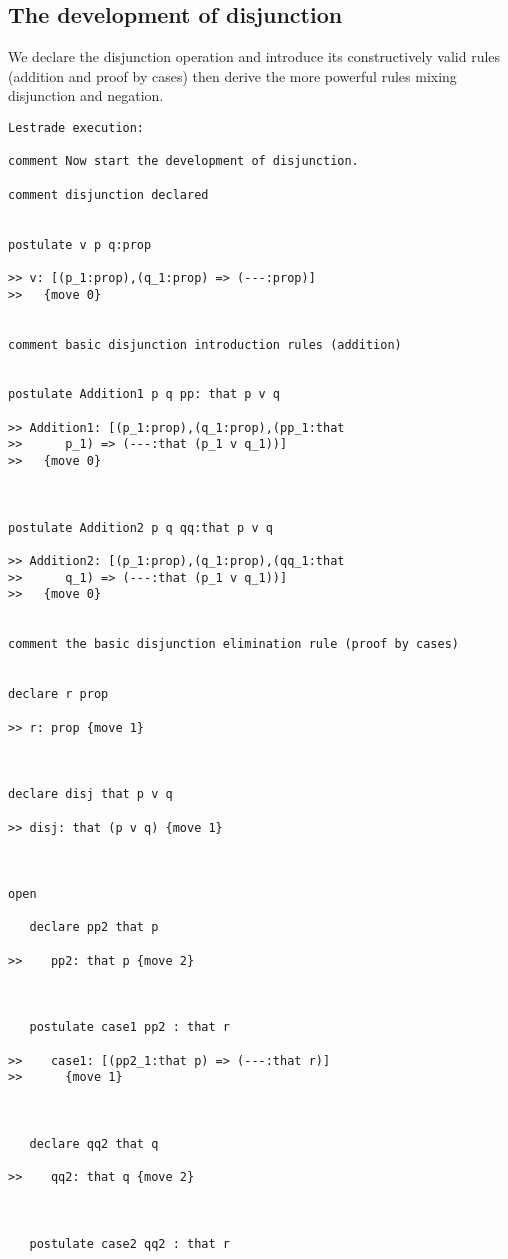 \documentclass[12pt]{article}
\begin{document}
\subsection{The development of disjunction}

We declare the disjunction operation and introduce its constructively valid rules (addition and proof by cases)  then derive the more powerful rules mixing disjunction and negation.

\begin{verbatim}Lestrade execution:

comment Now start the development of disjunction.

comment disjunction declared


postulate v p q:prop

>> v: [(p_1:prop),(q_1:prop) => (---:prop)]
>>   {move 0}


comment basic disjunction introduction rules (addition)


postulate Addition1 p q pp: that p v q

>> Addition1: [(p_1:prop),(q_1:prop),(pp_1:that
>>      p_1) => (---:that (p_1 v q_1))]
>>   {move 0}



postulate Addition2 p q qq:that p v q

>> Addition2: [(p_1:prop),(q_1:prop),(qq_1:that
>>      q_1) => (---:that (p_1 v q_1))]
>>   {move 0}


comment the basic disjunction elimination rule (proof by cases)


declare r prop

>> r: prop {move 1}



declare disj that p v q

>> disj: that (p v q) {move 1}



open

   declare pp2 that p

>>    pp2: that p {move 2}



   postulate case1 pp2 : that r

>>    case1: [(pp2_1:that p) => (---:that r)]
>>      {move 1}



   declare qq2 that q

>>    qq2: that q {move 2}



   postulate case2 qq2 : that r


\end{verbatim}
\end{document}

